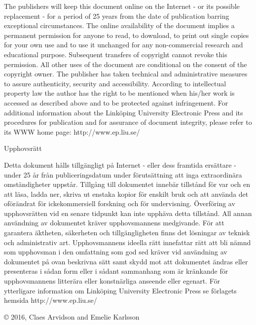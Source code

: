 \documentclass[a4paper, 10pt, twoside, openright]{book}
\newcommand{\putshortdate}[0]{2016}
\newcommand{\putauthor}[0]{Claes Arvidson and Emelie Karlsson}
\begin{document}
The publishers will keep this document online on the Internet - or its possible replacement - for a period of 25 years from the date of publication barring exceptional circumstances.
The online availability of the document implies a permanent permission for anyone to read, to download, to print out single copies for your own use and to use it unchanged for any non-commercial research and educational purpose. Subsequent transfers of copyright cannot revoke this permission. All other uses of the document are conditional on the consent of the copyright owner. The publisher has taken technical and administrative measures to assure authenticity, security and accessibility.
According to intellectual property law the author has the right to be mentioned when his/her work is accessed as described above and to be protected against infringement.
For additional information about the Linköping University Electronic Press and its procedures for publication and for assurance of document integrity, please refer to its WWW home page: http://www.ep.liu.se/
\bigskip

Upphovsr\"att
\medskip

Detta dokument hålls tillgängligt på Internet - eller dess framtida ersättare - under 25 år från publiceringsdatum under förutsättning att inga extraordi\-nära omständigheter uppstår.
Tillgång till dokumentet innebär tillstånd för var och en att läsa, ladda ner, skriva ut enstaka kopior för enskilt bruk och att använda det oförändrat för ickekommersiell forskning och för undervisning. Överföring av upphovsrätten vid en senare tidpunkt kan inte upphäva detta tillstånd. All annan användning av dokumentet kräver upphovsmannens medgivande. För att garantera äktheten, säkerheten och tillgängligheten finns det lösningar av teknisk och administrativ art.
Upphovsmannens ideella rätt innefattar rätt att bli nämnd som upphovsman i den omfattning som god sed kräver vid användning av dokumentet på ovan beskrivna sätt samt skydd mot att dokumentet ändras eller presenteras i sådan form eller i sådant sammanhang som är kränkande för upphovsmannens litterära eller konstnärliga anseende eller egenart.
För ytterligare information om Linköping University Electronic Press se förlagets hemsida http://www.ep.liu.se/

\medskip

\copyright\phantom{.} \putshortdate, \putauthor




\end{document}
